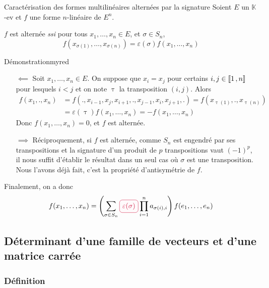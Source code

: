     \begin{theo}{Caractérisation des formes multilinéaires alternées par la signature}{}
        Soient $E$ un $\mathbb{K}$-ev et $f$ une forme $n$-linéaire de $E^n$.

        $f$ est alternée \textit{ssi} pour tous $x_1,\ldots,x_n \in E$, et $\sigma \in S_n$,
        \[ f\left(x_{\sigma(1)},\ldots,x_{\sigma(n)}\right) = \varepsilon(\sigma) f(x_1,\ldots,x_n) \]   
    \end{theo}

    \begin{demo}{Démonstration}{myred}
        \begin{itemize}
            \item[\textcolor{myred}{$\impliedby$}] Soit $x_1,\ldots,x_n \in E$. On suppose que $x_i = x_j$ pour certains $i,j \in \left\llbracket 1 \, , n \right\rrbracket$ pour lesquels $i < j$ et on note $\uptau$ la transposition $(i,j)$. Alors 
            \begin{align*}
                f(x_1,.,x_n) &= f(.,x_{i-1},x_j,x_{i+1},.,x_{j-1},x_i,x_{j+1},.) = f\left(x_{\uptau(1)},.,x_{\uptau(n)}\right) \\
                &= \varepsilon(\uptau)f(x_1,\ldots,x_n) = -f(x_1,\ldots,x_n)
            \end{align*}
            Donc $f(x_1,\ldots,x_n) = 0$, et $f$ est alternée.
            \item[\textcolor{myred}{$\implies$}] Réciproquement, si $f$ est alternée, comme $S_n$ est engendré par ses transpositions et la signature d’un produit de $p$ transpositions vaut $(-1)^p$, il nous suffit d’établir le résultat dans un seul cas où $\sigma$ est une transposition. Nous l’avons déjà fait, c’est la propriété d’antisymétrie de $f$.
        \end{itemize}
    \end{demo}

    Finalement, on a donc 
    \[ f(x_1,\ldots,x_n) = \left(\sum_{\sigma \in S_n} \lilbox{myred}{$\varepsilon(\sigma)$} \prod_{i = 1}^n a_{\sigma(i),i}\right) f(e_1,\ldots,e_n) \]

\subsection{Déterminant d’une famille de vecteurs et d’une matrice carrée}

    \subsubsection{Définition}

